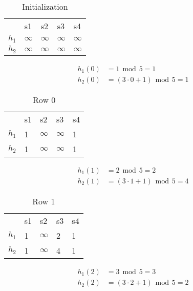 \documentclass[11pt,twoside,a4paper]{article}
\begin{document}
	\begin{table}[h!]
	\centering
	\label{my-label}
	\begin{tabular}{lllll}
	 & s1 & s2 & s3 & s4 \\
	 $h_1$ & $\infty$ & $\infty$ & $\infty$ & $\infty$ \\
	 $h_2$ & $\infty$ & $\infty$ & $\infty$ & $\infty$
	\end{tabular}
	\caption{Initialization}
	\end{table}
	
	\begin{align}
		h_1(0) &= 1 \hspace{5pt} \mbox{mod} \hspace{5pt} 5 = 1 \\
		h_2(0) &= (3 \cdot 0 + 1) \hspace{5pt} \mbox{mod} \hspace{5pt} 5 = 1 
	\end{align}
	
	\begin{table}[h!]
	\centering
	\label{my-label}
	\begin{tabular}{lllll}
	 & s1 & s2 & s3 & s4 \\
	 $h_1$ & 1 & $\infty$ & $\infty$ & 1 \\
	 $h_2$ & 1 & $\infty$ & $\infty$ & 1
	\end{tabular}
	\caption{Row 0}
	\end{table}
	
	\begin{align}
		h_1(1) &= 2 \hspace{5pt} \mbox{mod} \hspace{5pt} 5 = 2 \\
		h_2(1) &= (3 \cdot 1 + 1) \hspace{5pt} \mbox{mod} \hspace{5pt} 5 = 4 
	\end{align}
	
	\begin{table}[h!]
	\centering
	\label{my-label}
	\begin{tabular}{lllll}
	 & s1 & s2 & s3 & s4 \\
	 $h_1$ & 1 & $\infty$ & 2 & 1 \\
	 $h_2$ & 1 & $\infty$ & 4 & 1
	\end{tabular}
	\caption{Row 1}
	\end{table}
	
	\begin{align}
		h_1(2) &= 3 \hspace{5pt} \mbox{mod} \hspace{5pt} 5 = 3 \\
		h_2(2) &= (3 \cdot 2 + 1) \hspace{5pt} \mbox{mod} \hspace{5pt} 5 = 2 
	\end{align}
	
\end{document}
